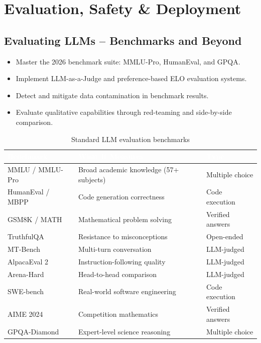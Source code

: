 \part{Evaluation, Safety \& Deployment}

\chapter{Evaluating LLMs -- Benchmarks and Beyond}
\minitoc

\begin{chapteroverview}
  \begin{itemize}
    \item Master the 2026 benchmark suite: MMLU-Pro, HumanEval, and GPQA.
    \item Implement LLM-as-a-Judge and preference-based ELO evaluation systems.
    \item Detect and mitigate data contamination in benchmark results.
    \item Evaluate qualitative capabilities through red-teaming and side-by-side comparison.
  \end{itemize}
\end{chapteroverview}

\begin{table}[H]
\centering\small\sffamily
{}
\begin{tabular}{L{3cm}L{4.5cm}L{2.5cm}}
\toprule
{}\textcolor{white}{\textbf{Benchmark}} & \textcolor{white}{\textbf{What It Measures}} & \textcolor{white}{\textbf{Type}} \\
\midrule
MMLU / MMLU-Pro & Broad academic knowledge (57+ subjects) & Multiple choice \\
HumanEval / MBPP & Code generation correctness & Code execution \\
GSM8K / MATH & Mathematical problem solving & Verified answers \\
TruthfulQA & Resistance to misconceptions & Open-ended \\
MT-Bench & Multi-turn conversation & LLM-judged \\
AlpacaEval 2 & Instruction-following quality & LLM-judged \\
Arena-Hard & Head-to-head comparison & LLM-judged \\
SWE-bench & Real-world software engineering & Code execution \\
AIME 2024 & Competition mathematics & Verified answers \\
GPQA-Diamond & Expert-level science reasoning & Multiple choice \\
\bottomrule
\end{tabular}
\caption{Standard LLM evaluation benchmarks}
\end{table}

